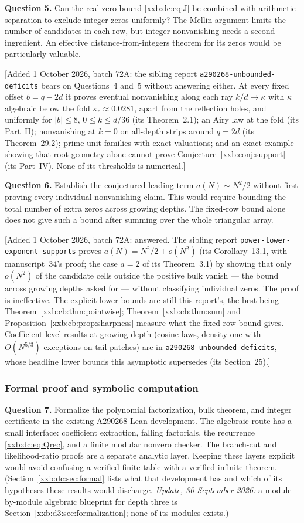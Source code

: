 \documentclass[11pt,a4paper]{article}
\numberwithin{equation}{section}
\theoremstyle{definition}
\theoremstyle{remark}
\theoremstyle{plain}
\newcommand{\sibPTE}{\texttt{power-\allowbreak{}tower-\allowbreak{}exponent-\allowbreak{}supports}}
\newcommand{\sibAUD}{\texttt{a290268-\allowbreak{}unbounded-\allowbreak{}deficits}}
\begin{document}
\textbf{Question 5.}  Can the real-zero bound \eqref{xxb:dc:eq:J} be combined
with arithmetic separation to exclude integer zeros uniformly?  The Mellin
argument limits the number of candidates in each row, but integer
nonvanishing needs a second ingredient.  An effective distance-from-integers
theorem for its zeros would be particularly valuable.

[Added 1 October 2026, batch 72A: the sibling report \sibAUD{} bears on Questions~4
and~5 without answering either.  At every fixed offset $b=q-2d$ it proves
eventual nonvanishing along each ray $k/d\to\kappa$ with $\kappa$ algebraic
below the fold $\kappa_c\approx0.0281$, apart from the reflection holes, and
uniformly for $|b|\le8$, $0\le k\le d/36$ (its Theorem~2.1); an Airy law at the
fold (its Part~II); nonvanishing at $k=0$ on all-depth strips around $q=2d$
(its Theorem~29.2); prime-unit families with exact valuations; and an exact
example showing that root geometry alone cannot prove
Conjecture~\ref{xxb:conj:support} (its Part~IV).  None of its thresholds is
numerical.]

\textbf{Question 6.}  Establish the conjectured leading term
$a(N)\sim N^2/2$ without first proving every individual nonvanishing
claim.  This would require bounding the total number of extra zeros
across growing depths.  The fixed-row bound alone does not give such a
bound after summing over the whole triangular array.

[Added 1 October 2026, batch 72A: answered.  The sibling report \sibPTE{} proves
$a(N)=N^2/2+o(N^2)$ (its Corollary~13.1, with manuscript~34's proof; the case
$a=2$ of its Theorem~3.1) by showing that only $o(N^2)$ of the candidate cells
outside the positive bulk vanish --- the bound across growing depths asked for
--- without classifying individual zeros.  The proof is ineffective.  The
explicit lower bounds are still this report's, the best being
Theorem~\ref{xxb:cb:thm:pointwise}; Theorem~\ref{xxb:cb:thm:sum} and
Proposition~\ref{xxb:cb:prop:sharpness} measure what the fixed-row bound gives.
Coefficient-level results at growing depth (cosine laws, density one with
$O(N^{5/3})$ exceptions on tail patches) are in \sibAUD{}, whose
headline lower bounds this asymptotic supersedes (its Section~25).]

\subsubsection{Formal proof and symbolic computation}
\textbf{Question 7.}  Formalize the polynomial factorization, bulk theorem,
and integer certificate in the existing A290268 Lean development.
The algebraic route has a small interface: coefficient extraction,
falling factorials, the recurrence \eqref{xxb:dc:eq:Qrec}, and a finite modular
nonzero checker.  The branch-cut and likelihood-ratio proofs are a
separate analytic layer.  Keeping these layers explicit would avoid
confusing a verified finite table with a verified infinite theorem.
(Section~\ref{xxb:dc:sec:formal} lists what that development has and which
of its hypotheses these results would discharge.  \emph{Update, 30 September
2026:} a module-by-module algebraic blueprint for depth three is
Section~\ref{xxb:d3:sec:formalization}; none of its modules exists.)
\end{document}

